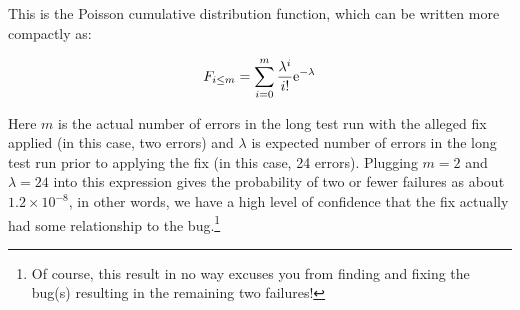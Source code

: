 This is the Poisson cumulative distribution function, which can be
written more compactly as:

\begin{equation}
	F_{i \le m} = \sum_{i=0}^m \frac{\lambda^i}{i!} \mathrm{e}^{-\lambda}
\label{eq:debugging:Possion CDF}
\end{equation}

Here $m$ is the actual number of errors in the long test run with the
alleged fix applied (in this case, two errors) and $\lambda$ is expected
number of errors in the long test run prior to applying the fix (in this
case, 24 errors).
Plugging $m=2$ and $\lambda=24$ into this expression gives the probability
of two or fewer failures as about
$1.2 \times 10^{-8}$, in other words, we have a high level of confidence
that the fix actually had some relationship to the bug.\footnote{
	Of course, this result in no way excuses you from finding and
	fixing the bug(s) resulting in the remaining two failures!}

